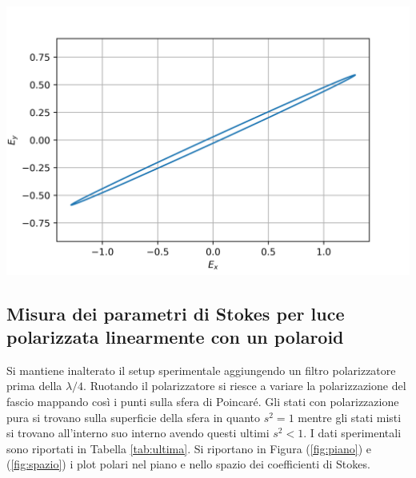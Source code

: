 \documentclass[10pt,oneside,a4paper]{article}
\newenvironment{Figure}
  {\par\medskip\noindent\minipage{\linewidth}}
  {\endminipage\par\medskip}
\begin{document}
\begin{multicols}{2}
\begin{Figure}
	\begin{center}
	\includegraphics[width=\linewidth]{Efield.png}
	\label{fig:Efield}
	\end{center}
\end{Figure}

\subsection{Misura dei parametri di Stokes per luce polarizzata linearmente con un polaroid}
Si mantiene inalterato il setup sperimentale aggiungendo un filtro polarizzatore prima della $\lambda/4$. Ruotando il polarizzatore si riesce a variare la polarizzazione del fascio mappando così i punti sulla sfera di Poincaré. Gli stati con polarizzazione pura si trovano sulla superficie della sfera in quanto $s^2 =1$ mentre gli stati misti si trovano all’interno suo interno avendo questi ultimi $s^2<1$. I dati sperimentali sono riportati in Tabella \ref{tab:ultima}. Si riportano in Figura (\ref{fig:piano}) e (\ref{fig:spazio}) i plot polari nel piano e nello spazio dei coefficienti di Stokes. 


\end{multicols}
\end{document}
